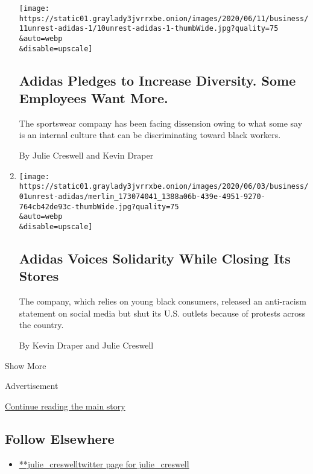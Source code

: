 \begin{enumerate}
  \texttt{[image: https://static01.graylady3jvrrxbe.onion/images/2020/06/11/business/11unrest-adidas-1/10unrest-adidas-1-thumbWide.jpg?quality=75\\\&auto=webp\\\&disable=upscale]}

  \hypertarget{adidas-pledges-to-increase-diversity-some-employees-want-more}{%
  \subsection{Adidas Pledges to Increase Diversity. Some Employees Want
  More.}\label{adidas-pledges-to-increase-diversity-some-employees-want-more}}

  The sportswear company has been facing dissension owing to what some
  say is an internal culture that can be discriminating toward black
  workers.

  By Julie Creswell and Kevin Draper
\item
  \href{/2020/06/02/business/adidas-george-floyd-protests.html}{}

  \texttt{[image: https://static01.graylady3jvrrxbe.onion/images/2020/06/03/business/01unrest-adidas/merlin\_173074041\_1388a06b-439e-4951-9270-764cb42de93c-thumbWide.jpg?quality=75\\\&auto=webp\\\&disable=upscale]}

  \hypertarget{adidas-voices-solidarity-while-closing-its-stores}{%
  \subsection{Adidas Voices Solidarity While Closing Its
  Stores}\label{adidas-voices-solidarity-while-closing-its-stores}}

  The company, which relies on young black consumers, released an
  anti-racism statement on social media but shut its U.S. outlets
  because of protests across the country.

  By Kevin Draper and Julie Creswell
\end{enumerate}

Show More

Advertisement

\protect\hyperlink{after-mid2}{Continue reading the main story}

\hypertarget{follow-elsewhere}{%
\subsection{Follow Elsewhere}\label{follow-elsewhere}}

\begin{itemize}
\tightlist
\item
  \href{https://twitter.com/julie_creswell}{**julie\_creswelltwitter
  page for julie\_creswell}
\end{itemize}

